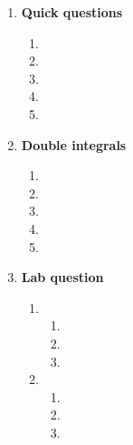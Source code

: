 \documentclass[11pt]{article}
\begin{document}
\begin{enumerate}
\begin{enumerate}
          \end{enumerate}
    \item \textbf{Quick questions}
          \begin{enumerate}
              \item
              \item
              \item
              \item
              \item
          \end{enumerate}
    \item \textbf{Double integrals}
          \begin{enumerate}
              \item
              \item
              \item
              \item
              \item
          \end{enumerate}
    \item \textbf{Lab question}
          \begin{enumerate}
              \item
                    \begin{enumerate}
                        \item
                        \item
                        \item
                    \end{enumerate}
              \item
                    \begin{enumerate}
                        \item
                        \item
                        \item
                    \end{enumerate}
          \end{enumerate}
\end{enumerate}
\end{document}
